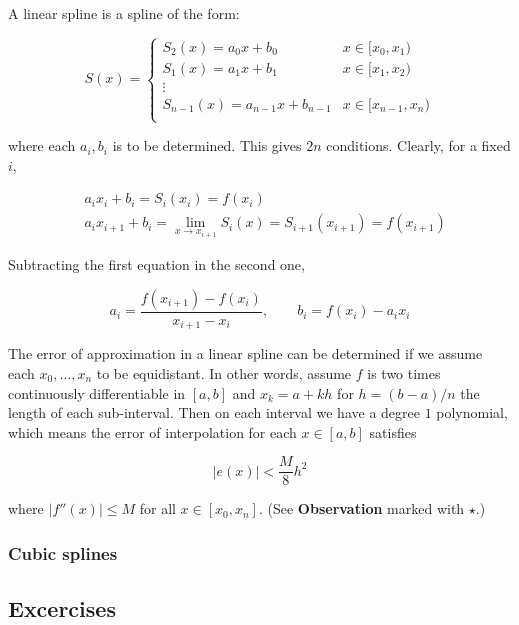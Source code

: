 \documentclass[12pt]{article}
\theoremstyle{definition}
\begin{document}
A linear spline is a spline of the form:

\begin{equation*}
    S(x) = \begin{cases}
        S_2(x) = a_0x + b_0 & x \in [x_0, x_1)\\
        S_1(x) = a_1x + b_1 & x \in [x_1, x_2)\\
        \vdots \\
        S_{n-1}(x) = a_{n-1}x + b_{n-1} & x \in [x_{n-1}, x_n)\\
    \end{cases}
\end{equation*}

where each $a_i, b_i$ is to be determined. This gives $2n$ conditions. Clearly,
for a fixed $i$,

\begin{align*}
    &a_i x_i + b_i = S_i(x_i) = f(x_i) \\ 
    &a_i x_{i+1} + b_i = \lim_{x \to x_{i+1}} S_i(x) = S_{i+1}(x_{i+1}) =
    f(x_{i+1})
\end{align*}

Subtracting the first equation in the second one,

\begin{equation*}
    a_i = \frac{f(x_{i+1}) - f(x_i)}{x_{i+1} - x_i}, \qquad b_i = f(x_i) -
    a_ix_i
\end{equation*}

The error of approximation in a linear spline can be determined if we assume
each $x_0, \ldots, x_n$ to be equidistant. In other words, assume $f$ is two
times continuously differentiable in $[a, b]$ and $x_k = a + kh$ for $h = (b-a)
/ n$ the length of each sub-interval. Then on each interval we have a degree $1$
polynomial, which means the error of interpolation for each $x \in [a, b]$
satisfies 

\begin{equation*}
    \left| e(x) \right|  < \frac{M}{8}h^2
\end{equation*}

where $\left| f''(x) \right| \leq M$ for all $x \in [x_0, x_n]$. (See
\textbf{Observation} marked with $\star$.)

\subsubsection{Cubic splines}

\pagebreak 

\subsection{Excercises}
\end{document}
